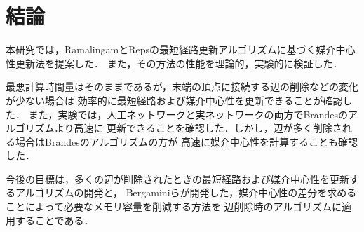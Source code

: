 \chapter{結論}
\label{chap:conclusion}

本研究では，RamalingamとRepsの最短経路更新アルゴリズムに基づく媒介中心性更新法を提案した．
また，その方法の性能を理論的，実験的に検証した．

最悪計算時間量はそのままであるが，末端の頂点に接続する辺の削除などの変化が少ない場合は
効率的に最短経路および媒介中心性を更新できることが確認した．
また，実験では，人工ネットワークと実ネットワークの両方でBrandesのアルゴリズムより高速に
更新できることを確認した．しかし，辺が多く削除される場合はBrandesのアルゴリズムの方が
高速に媒介中心性を計算することも確認した．

今後の目標は，多くの辺が削除されたときの最短経路および媒介中心性を更新するアルゴリズムの開発と，
Bergaminiらが開発した，媒介中心性の差分を求めることによって必要なメモリ容量を削減する方法を
辺削除時のアルゴリズムに適用することである．
